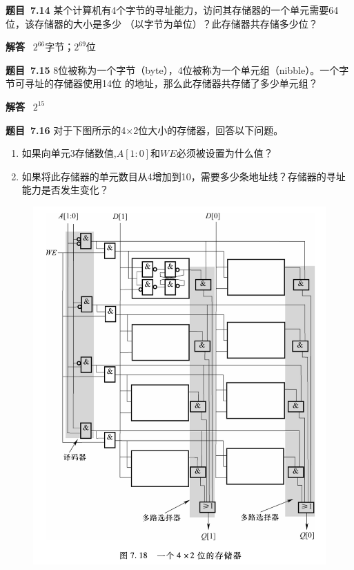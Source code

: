 \documentclass[10pt,a4paper,UTF8]{ctexart}
\newcommand{\problemname}{待定义}
\newenvironment{problem}{\begin{shaded}\par\noindent\textbf{题目\  \problemname}}{\end{shaded}\par}
\newenvironment{solution}{\par\noindent\textbf{解答}\ }{\par}
\begin{document}
\renewcommand{\problemname}{7.14}
\begin{problem}
	某个计算机有4个字节的寻址能力，访问其存储器的一个单元需要64位，该存储器的大小是多少
	（以字节为单位）？此存储器共存储多少位？
\end{problem}

\begin{solution}
	$2^{66}$字节；$2^{69}$位
\end{solution}


\renewcommand{\problemname}{7.15}
\begin{problem}
	8位被称为一个字节（byte），4位被称为一个单元组（nibble）。一个字节可寻址的存储器使用14位
	的地址，那么此存储器共存储了多少单元组？
\end{problem}

\begin{solution}
	$2^{15}$
\end{solution}


\renewcommand{\problemname}{7.16}
\begin{problem}
	对于下图所示的4×2位大小的存储器，回答以下问题。
	\begin{enumerate}[(1)]
		\item 如果向单元3存储数值,$A[1:0]$和$WE$必须被设置为什么值？
		\item 如果将此存储器的单元数目从4增加到10，需要多少条地址线？存储器的寻址能力是否发生变化？
	\end{enumerate}
\end{problem}

\begin{figure}[htbp]
	\centering
	\includegraphics[scale=0.37]{img/7.16.png}
\end{figure}
\end{document}
